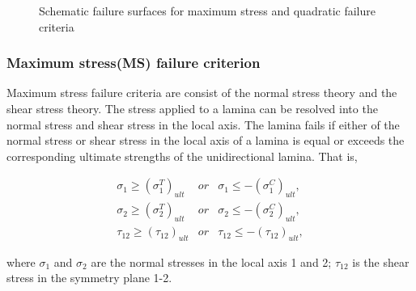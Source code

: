 \begin{figure}[b]
\centering
{}
\caption{Schematic failure surfaces for maximum stress and quadratic failure
criteria}
\label{fig:failure_surface}
\end{figure}

\subsubsection{Maximum stress(MS) failure criterion}

Maximum stress failure criteria are consist of the normal stress theory and the
shear stress theory. The stress applied to a lamina can be resolved into the
normal stress and shear stress in the local axis. The lamina fails if either of
the normal stress or shear stress in the local axis of a lamina is equal or
exceeds the corresponding ultimate strengths of the unidirectional lamina.  That
is,

\begin{equation}
	\begin{array}{lll}
		\sigma_1 \geq (\sigma _1^{T})_{ult} & \textstyle{ or } &  \sigma_1 \leq -(\sigma _1^{C})_{ult} \textstyle{,} \\
		\sigma_2 \geq (\sigma _2^{T})_{ult} & \textstyle{ or } &   \sigma_2 \leq -(\sigma _2^{C})_{ult} \textstyle{,} \\
		\tau_{12} \geq (\tau_{12})_{ult}    & \textstyle{ or } &     \tau_{12} \leq -(\tau_{12})_{ult}  \textstyle{,}
\end{array}
\end{equation}

where $\sigma_1$ and $\sigma_2$ are the normal stresses in the local axis 1 and 2;
$\tau_{12}$ is the shear stress in the symmetry plane 1-2.

